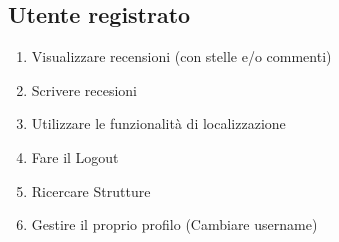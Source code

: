 \documentclass{article}
\begin{document}
 \subsection{Utente registrato} 
 \begin{enumerate}
    \item Visualizzare recensioni (con stelle e/o commenti)
    \item Scrivere recesioni
    \item Utilizzare le funzionalità di localizzazione
    \item Fare il Logout
    \item Ricercare Strutture
    \item Gestire il proprio profilo (Cambiare username)
 \end{enumerate}
\end{document}
